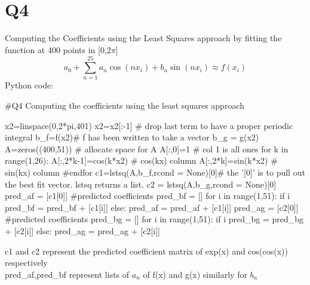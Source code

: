 \documentclass[12pt, a4paper]{report}
\begin{document}
\section*{Q4}
Computing the Coefficients using the Least Squares approach by fitting the function at 400 points in [0,2$\pi$]\\
\begin{equation}
    a_{0} + \sum\limits_{n=1}^{25} {{a_{n}\cos(nx_{i})+b_{n}\sin(nx_{i})}} \approx f(x_{i})             
    \end{equation} 
 Python code:
\begin{py_code}
#Q4 Computing the coefficients using the least squares approach

x2=linspace(0,2*pi,401)
x2=x2[:-1] # drop last term to have a proper periodic integral
b_f=f(x2)# f has been written to take a vector
b_g = g(x2)
A=zeros((400,51)) # allocate space for A
A[:,0]=1 # col 1 is all ones
for k in range(1,26):
    A[:,2*k-1]=cos(k*x2) # cos(kx) column
    A[:,2*k]=sin(k*x2) # sin(kx) column
#endfor
c1=lstsq(A,b_f,rcond = None)[0]# the ’[0]’ is to pull out the best fit vector. lstsq returns a list.
c2 = lstsq(A,b_g,rcond = None)[0]
pred_af = [c1[0]] #predicted coefficients
pred_bf = []
for i in range(1,51):
    if i%
        pred_bf = pred_bf + [c1[i]]
    else:
        pred_af = pred_af + [c1[i]]
pred_ag = [c2[0]]  #predicted coefficients
pred_bg = []
for i in range(1,51):
    if i%
        pred_bg = pred_bg + [c2[i]]
    else:
        pred_ag = pred_ag + [c2[i]]   
\end{py_code}
c1 and c2 represent the predicted coefficient matrix of exp(x) and cos(cos(x)) respectively\\
pred\_af,pred\_bf represent lists of $a_n$ of f(x) and g(x) similarly for $b_n$ 
\end{document}
